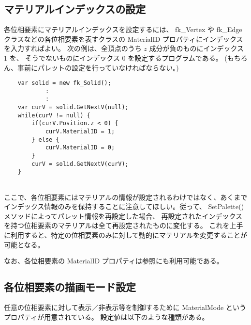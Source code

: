 \subsection{マテリアルインデックスの設定} \label{subsec:solid_matid}
各位相要素にマテリアルインデックスを設定するには、
fk\_Vertex や fk\_Edge クラスなどの各位相要素を表すクラスの
MaterialID プロパティにインデックスを入力すればよい。
次の例は、全頂点のうち \(z\) 成分が負のものにインデックス 1 を、
そうでないものにインデックス 0 を設定するプログラムである。
(もちろん、事前にパレットの設定を行っていなければならない。)
\\
\begin{breakbox}
\begin{verbatim}
    var solid = new fk_Solid();
            :
            :
    var curV = solid.GetNextV(null);
    while(curV != null) {
        if(curV.Position.z < 0) {
            curV.MaterialID = 1;
        } else {
            curV.MaterialID = 0;
        }
        curV = solid.GetNextV(curV);
    }
\end{verbatim}
\end{breakbox}
~ \\
ここで、各位相要素にはマテリアルの情報が設定されるわけではなく、あくまで
インデックス情報のみを保持することに注意してほしい。従って、
SetPalette() メソッドによってパレット情報を再設定した場合、
再設定されたインデックスを持つ位相要素のマテリアルは全て再設定されたものに変化する。
これを上手に利用すると、特定の位相要素のみに対して動的にマテリアルを変更することが
可能となる。

なお、各位相要素の MaterialID プロパティは参照にも利用可能である。

\subsection{各位相要素の描画モード設定}	\label{subsec:matmode}
任意の位相要素に対して表示／非表示等を制御するために
MaterialMode というプロパティが用意されている。
設定値は以下のような種類がある。

